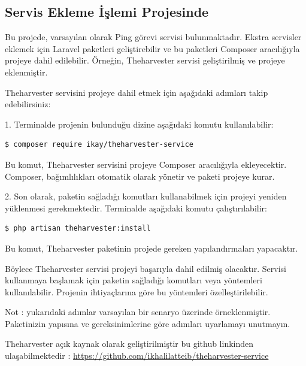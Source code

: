 \subsection{Servis Ekleme İşlemi Projesinde}

Bu projede, varsayılan olarak Ping görevi servisi bulunmaktadır. Ekstra servisler eklemek için Laravel paketleri geliştirebilir ve bu paketleri Composer aracılığıyla projeye dahil edilebilir. Örneğin, Theharvester servisi geliştirilmiş ve projeye eklenmiştir.

Theharvester servisini projeye dahil etmek için aşağıdaki adımları takip edebilirsiniz:

1. Terminalde projenin bulunduğu dizine aşağıdaki komutu kullanılabilir:
\begin{lstlisting}[language=bash]
	$ composer require ikay/theharvester-service
\end{lstlisting}

Bu komut, Theharvester servisini projeye Composer aracılığıyla ekleyecektir. Composer, bağımlılıkları otomatik olarak yönetir ve paketi projeye kurar.

2. Son olarak, paketin sağladığı komutları kullanabilmek için projeyi yeniden yüklenmesi gerekmektedir. Terminalde aşağıdaki komutu çalıştırılabilir:
\begin{lstlisting}[language=bash]
	$ php artisan theharvester:install
\end{lstlisting}

Bu komut, Theharvester paketinin projede gereken yapılandırmaları yapacaktır.

Böylece Theharvester servisi projeyi başarıyla dahil edilmiş olacaktır. Servisi kullanmaya başlamak için paketin sağladığı komutları veya yöntemleri kullanılabilir. Projenin ihtiyaçlarına göre bu yöntemleri özelleştirilebilir.

Not : yukarıdaki adımlar varsayılan bir senaryo üzerinde örneklenmiştir. Paketinizin yapısına ve gereksinimlerine göre adımları uyarlamayı unutmayın.

Theharvester açık kaynak olarak geliştirilmiştir bu github linkinden ulaşabilmektedir : \href{https://github.com/ikhalilatteib/theharvester-service}{https://github.com/ikhalilatteib/theharvester-service}

